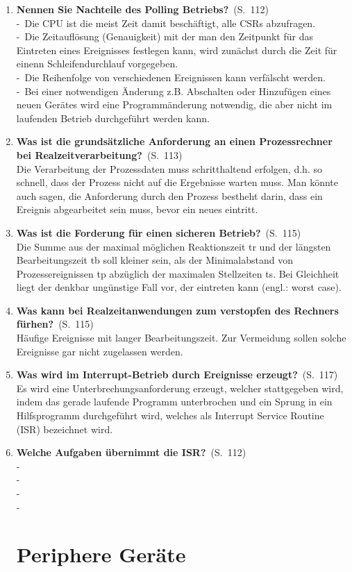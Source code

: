 \documentclass[a4paper,12pt]{article}
\newcommand{\question}[3]{\pagebreak[3]\item {\textbf{#1?}}\ (S.\ #2)#3}
\newcommand{\catchword}[1]{\\-\ #1}
\newcommand{\normaltext}[1]{\\#1}
\newcommand{\page}[1]{#1}
\begin{document}
\begin{enumerate}
  \question{Nennen Sie Nachteile des Polling Betriebs}{\page{112}}
  {
    \catchword{Die CPU ist die meist Zeit damit beschäftigt, alle CSRs abzufragen.}
    \catchword{Die Zeitauflösung (Genauigkeit) mit der man den Zeitpunkt für das Eintreten
    eines Ereignisses festlegen kann, wird zunächst durch die Zeit für einenn Schleifendurchlauf
    vorgegeben.}
    \catchword{Die Reihenfolge von verschiedenen Ereignissen kann verfälscht werden.}
    \catchword{Bei einer notwendigen Änderung z.B. Abschalten oder Hinzufügen eines neuen
    Gerätes wird eine Programmänderung notwendig, die aber nicht im laufenden Betrieb 
    durchgeführt werden kann.}
  }
  
   \question{Was ist die grundsätzliche Anforderung an einen Prozessrechner bei Realzeitverarbeitung}{\page{113}}
  {
    \normaltext{Die Verarbeitung der Prozessdaten muss schritthaltend erfolgen, d.h. so schnell,
    dass der Prozess nicht auf  die Ergebnisse warten muss. Man könnte auch sagen, die Anforderung
    durch den Prozess bestheht darin, dass ein Ereignis abgearbeitet sein muss, bevor ein neues eintritt.}
  }
  
  \question{Was ist die Forderung für einen sicheren Betrieb}{\page{115}}
  {
    \normaltext{Die Summe aus der maximal möglichen Reaktionszeit tr und der längsten Bearbeitungszeit tb
    soll kleiner sein, als der Minimalabstand von Prozessereignissen tp abzüglich der maximalen Stellzeiten ts.
    Bei Gleichheit liegt der denkbar ungünstige Fall vor, der eintreten kann (engl.: worst case).}
  }
  
    \question{Was kann bei Realzeitanwendungen zum verstopfen des Rechners fürhen}{\page{115}}
  {
    \normaltext{Häufige Ereignisse mit langer Bearbeitungszeit. Zur Vermeidung sollen solche Ereignisse gar 
    nicht zugelassen werden.}
  }


  \question{Was wird im Interrupt-Betrieb durch Ereignisse erzeugt}{\page{117}}
  {
    \normaltext{Es wird eine Unterbrechungsanforderung erzeugt, welcher stattgegeben wird, indem das gerade
    laufende Programm unterbrochen und ein Sprung in ein Hilfsprogramm durchgeführt wird, welches als Interrupt
    Service Routine (ISR) bezeichnet wird.}
  }
  
  \question{Welche Aufgaben übernimmt die ISR}{\page{112}}
  {
    \catchword{}
    \catchword{}
    \catchword{}
    \catchword{}
  }

  \newpage
  \section{Periphere Geräte}
  

\end{enumerate}
\end{document}
